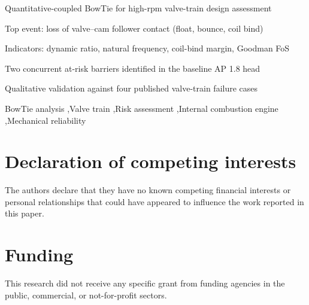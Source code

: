 \documentclass[a4paper,fleqn]{cas-dc}
\begin{document}
\begin{highlights}
\item Quantitative-coupled BowTie for high-rpm valve-train design assessment
\item Top event: loss of valve--cam follower contact (float, bounce, coil bind)
\item Indicators: dynamic ratio, natural frequency, coil-bind margin, Goodman FoS
\item Two concurrent at-risk barriers identified in the baseline AP 1.8 head
\item Qualitative validation against four published valve-train failure cases
\end{highlights}

\begin{keywords}
BowTie analysis \sep Valve train \sep Risk assessment \sep Internal combustion engine \sep Mechanical reliability
\end{keywords}

\maketitle










\section*{Declaration of competing interests}
The authors declare that they have no known competing financial interests
or personal relationships that could have appeared to influence the work
reported in this paper.

\section*{Funding}
This research did not receive any specific grant from funding agencies in
the public, commercial, or not-for-profit sectors.
\end{document}
